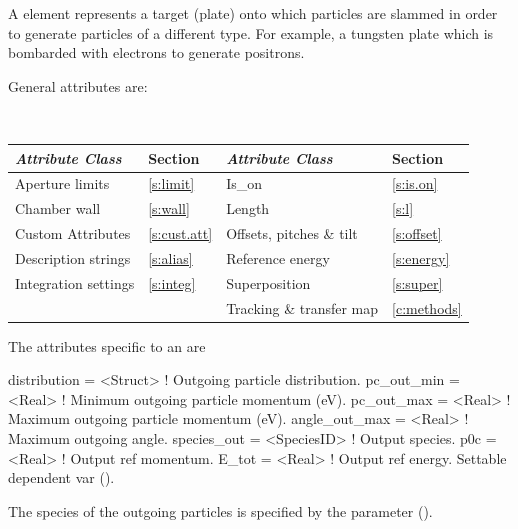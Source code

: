 A  element represents a target (plate) onto which particles are slammed in order to generate
particles of a different type. For example, a tungsten plate which is bombarded with electrons to
generate positrons.

General  attributes are:
\begin{center}
\tt
\begin{tabular}{llll} \toprule
  {\sl Attribute Class}      & Section           & {\sl Attribute Class}      & Section         \\ \midrule
  Aperture limits            & \ref{s:limit}     & Is_on                      & \ref{s:is.on}   \\
  Chamber wall               & \ref{s:wall}      & Length                     & \ref{s:l}       \\
  Custom Attributes          & \ref{s:cust.att}  & Offsets, pitches \& tilt   & \ref{s:offset}  \\
  Description strings        & \ref{s:alias}     & Reference energy           & \ref{s:energy}  \\ 
  Integration settings       & \ref{s:integ}     & Superposition              & \ref{s:super}   \\
                             &                   & Tracking \& transfer map   & \ref{c:methods} \\ 
  \bottomrule
\end{tabular}
\end{center}

The attributes specific to an  are 
\begin{example}
  distribution    = <Struct>    ! Outgoing particle distribution.
  pc_out_min      = <Real>      ! Minimum outgoing particle momentum (eV).
  pc_out_max      = <Real>      ! Maximum outgoing particle momentum (eV).
  angle_out_max   = <Real>      ! Maximum outgoing angle.
  species_out     = <SpeciesID> ! Output species.
  p0c             = <Real>      ! Output ref momentum.
  E_tot           = <Real>      ! Output ref energy. Settable dependent var ().
\end{example}

The species of the outgoing particles is specified by the  parameter
().


